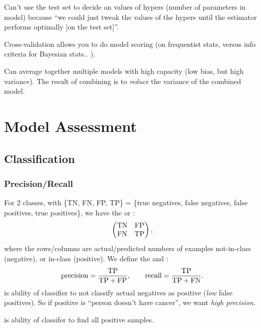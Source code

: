 \documentclass[11pt]{article}
\begin{document}
Can't use the test set to decide on values of hypers (\eeg number of parameters
in model) because ``we could just tweak the values of the hypers until the
estimator performs optimally [on the test set]''.

Cross-validation allows you to do model scoring (on frequentist stats, versus
\eeg info criteria for Bayesian stats.. ).

Can average together multiple models with high capacity (low bias, but high
variance). The result of combining is to \emph{reduce} the variance of the
combined model.



\section{Model Assessment}
\label{sec:model_ass}
\subsection{Classification}
\subsubsection{Precision/Recall}
For 2 classes, with \{TN, FN, FP, TP\} = \{true negatives, false negatives,
false positives, true positives\}, we have the  or :
\begin{equation}
  \left(
    \begin{matrix}
      \textrm{TN} & \textrm{FP}\\
      \textrm{FN} & \textrm{TP}
    \end{matrix}
  \right),
\end{equation}
where the rows/columns are actual/predicted numbers of examples not-in-class
(negative), or in-class (positive). We define the  and
:
\begin{equation}
  \textrm{precision} = \frac{\textrm{TP}}{\textrm{TP} + \textrm{FP}}, \qquad
  \textrm{recall} = \frac{\textrm{TP}}{\textrm{TP} + \textrm{FN}}.
\end{equation}
 is ability of classifier to not classify actual negatives as
positive (\eie \emph{low} false positives). So \eeg if positive is ``person
doesn't have cancer'', we want \emph{high precision}.

 is ability of classifer to find all positive samples.
\end{document}

